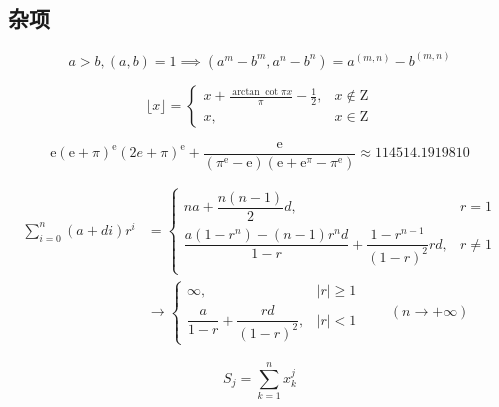\subsection{杂项}

\begin{equation}
    a>b,(a,b)=1 \implies (a^m-b^m,a^n-b^n)=a^{(m,n)}-b^{(m,n)}
\end{equation}

\begin{equation}
    \lfloor x\rfloor=\begin{cases}
        \displaystyle x+\frac{\arctan\cot\pi x}{\pi}-\frac{1}{2}, & x\notin\mathrm{Z} \\
        x,                                                        & x\in\mathrm{Z}
    \end{cases}
\end{equation}

\begin{equation}
    \mathrm{e}(\mathrm{e}+\pi)^\mathrm{e}(2e + \pi)^\mathrm{e}+\frac{\mathrm{e}}{(\pi^\mathrm{e}-\mathrm{e})(\mathrm{e}+\mathrm{e}^\pi-\pi^\mathrm{e})}\approx 114514.1919810
\end{equation}

\begin{equation}
    \begin{aligned}
        \sum_{i=0}^n(a+di)r^i & =\begin{cases}
                                     na+\dfrac{n(n-1)}{2}d,                                        & r=1    \\
                                     \dfrac{a(1-r^n)-(n-1)r^nd}{1-r}+\dfrac{1-r^{n-1}}{(1-r)^2}rd, & r\ne 1 \\
                                 \end{cases} \\
                              & \to\begin{cases}
                                       \infty,                             & |r|\geq 1 \\
                                       \dfrac{a}{1-r}+\dfrac{rd}{(1-r)^2}, & |r|<1
                                   \end{cases}\qquad(n\to+\infty)
    \end{aligned}
\end{equation}

\begin{equation}
    S_j = \sum_{k=1}^nx_k^j 
\end{equation}

